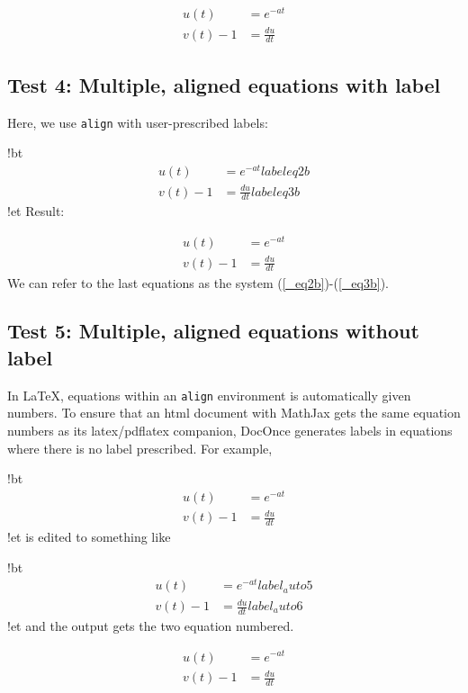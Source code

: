 \documentclass[%
oneside,                 %
final,                   %
10pt]{article}
\begin{document}
\begin{align*}
u(t)&=e^{-at}\\ 
v(t) - 1 &= \frac{du}{dt}
\end{align*}

\subsection{Test 4: Multiple, aligned equations with label}

Here, we use \texttt{align} with user-prescribed labels:

\blatexcod
!bt
\begin{align}
u(t)&=e^{-at}
label{eq2b}\\ 
v(t) - 1 &= \frac{du}{dt}
label{eq3b}
\end{align}
!et
\elatexcod
Result:

\begin{align}
u(t)&=e^{-at}
\label{_eq2b}\\ 
v(t) - 1 &= \frac{du}{dt}
\label{_eq3b}
\end{align}
We can refer to the last equations as the system (\ref{_eq2b})-(\ref{_eq3b}).

\subsection{Test 5: Multiple, aligned equations without label}

In {\LaTeX}, equations within an \texttt{align} environment is automatically
given numbers.  To ensure that an html document with MathJax gets the
same equation numbers as its latex/pdflatex companion, DocOnce
generates labels in equations where there is no label prescribed. For
example,

\blatexcod
!bt
\begin{align}
u(t)&=e^{-at}
\\ 
v(t) - 1 &= \frac{du}{dt}
\end{align}
!et
\elatexcod
is edited to something like

\blatexcod
!bt
\begin{align}
u(t)&=e^{-at}
label{_auto5}\\ 
v(t) - 1 &= \frac{du}{dt}
label{_auto6}
\end{align}
!et
\elatexcod
and the output gets the two equation numbered.

\begin{align}
u(t)&=e^{-at}\\ 
v(t) - 1 &= \frac{du}{dt}
\end{align}
\end{document}

